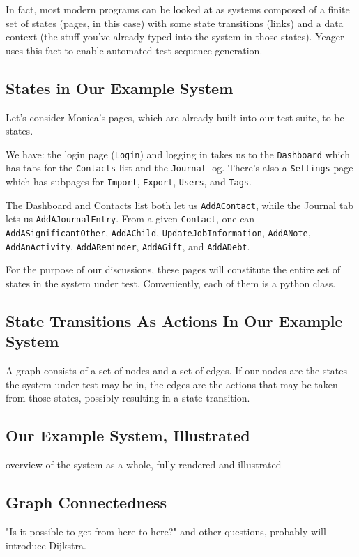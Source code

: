 In fact, most modern programs can be looked at as systems composed of a finite set of states (pages, in this case) with some state transitions (links) and a data context (the stuff you've already typed into the system in those states). Yeager uses this fact to enable automated test sequence generation.

\subsection{States in Our Example System}
Let's consider Monica's pages, which are already built into our test suite, to be states.

We have: the login page (\texttt{Login}) and logging in takes us to the \texttt{Dashboard} which has tabs for the \texttt{Contacts} list and the \texttt{Journal} log. There's also a \texttt{Settings} page which has subpages for \texttt{Import}, \texttt{Export}, \texttt{Users}, and \texttt{Tags}.

The Dashboard and Contacts list both let us \texttt{AddAContact}, while the Journal tab lets us \texttt{AddAJournalEntry}. From a given \texttt{Contact}, one can \texttt{AddASignificantOther}, \texttt{AddAChild}, \texttt{UpdateJobInformation}, \texttt{AddANote}, \texttt{AddAnActivity}, \texttt{AddAReminder}, \texttt{AddAGift}, and \texttt{AddADebt}.

For the purpose of our discussions, these pages will constitute the entire set of states in the system under test. Conveniently, each of them is a python class.

\subsection{State Transitions As Actions In Our Example System}
A graph consists of a set of nodes and a set of edges. If our nodes are the states the system under test may be in, the edges are the actions that may be taken from those states, possibly resulting in a state transition.

\subsection{Our Example System, Illustrated}
overview of the system as a whole, fully rendered and illustrated

\subsection{Graph Connectedness}
"Is it possible to get from here to here?" and other questions, probably will introduce Dijkstra.


